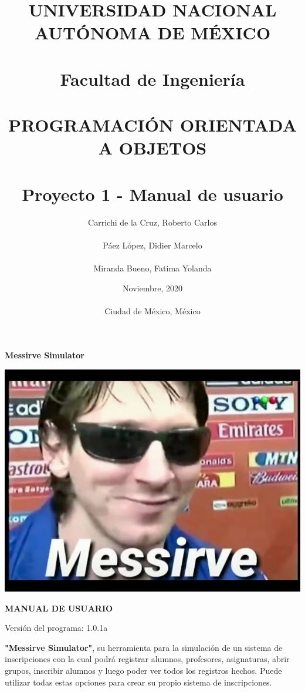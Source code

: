 \documentclass[12pt]{report}
\title{UNIVERSIDAD NACIONAL AUTÓNOMA DE MÉXICO\\ \ \\Facultad de Ingeniería\\ \ \\PROGRAMACIÓN ORIENTADA A OBJETOS\\ \ \\Proyecto 1 - Manual de usuario\\}
\author{Carrichi de la Cruz, Roberto Carlos\\ \ \\Páez López, Didier Marcelo\\ \ \\Miranda Bueno, Fatima Yolanda}
\date{Noviembre, 2020\\ \ \\Ciudad de México, México}
\begin{document}
\maketitle %


\begin{center}
\begin{Huge}
\textbf{Messirve Simulator}
\end{Huge}
\end{center}

\begin{center}
\vspace{2cm}
    \includegraphics[width=1\textwidth]{img/Messirve.jpeg}
\begin{large}

\vspace{1cm}
\begin{LARGE}
\textbf{MANUAL DE USUARIO}
\vspace{1cm}
\end{LARGE}

Versión del programa: 1.0.1a

\vspace{2cm}
\end{large}
\end{center}

\newpage
\textbf{"Messirve Simulator"}, su herramienta para la simulación de un sistema de inscripciones con la cual podrá registrar alumnos, profesores, asignaturas, abrir grupos, inscribir alumnos y luego poder ver todos los registros hechos. Puede utilizar todas estas opciones para crear su propio sistema de inscripciones.
\end{document}
